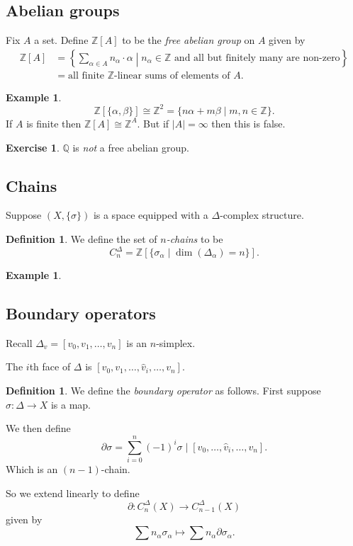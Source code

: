 \documentclass[12pt]{article}
\theoremstyle{definition}
\theoremstyle{definition}
\newtheorem{defn}[thm]{Definition}
\newtheorem{ex}[thm]{Example}
\newtheorem*{exer}{Exercise}
\newcommand{\ZZ}{\mathbb{Z}}
\newcommand{\QQ}{\mathbb{Q}}
\begin{document}
\subsection{Abelian groups}
Fix $A$ a set.
Define $\ZZ[A]$ to be the \emph{free abelian group} on $A$ given by
\begin{align*}
\ZZ[A] &= \left\{ \sum_{\alpha\in A} n_\alpha \cdot \alpha \middle| n_\alpha\in\ZZ\text{ and all but finitely many are non-zero}\right\} \\
&= \text{all finite }\ZZ\text{-linear sums of elements of }A.
\end{align*}

\begin{ex}
\[\ZZ[\{\alpha,\beta\}] \cong \ZZ^2 = \{n\alpha + m\beta \mid m,n\in \ZZ\}.\]
If $A$ is finite then $\ZZ[A] \cong \ZZ^A$.
But if $|A| = \infty$ then this is false.
\end{ex}

\begin{exer}
$\QQ$ is \emph{not} a free abelian group.
\end{exer}

\subsection{Chains}
Suppose $(X,\{\sigma\})$ is a space equipped with a $\Delta$-complex structure.

\begin{defn}
We define the set of \emph{$n$-chains} to be
\[C_n^\Delta = \ZZ[\{\sigma_\alpha \mid \dim(\Delta_\alpha) = n\}].\]
\end{defn}

\begin{ex}
\end{ex}

\subsection{Boundary operators}
Recall $\Delta_v = [v_0, v_1,\ldots,v_n]$ is an $n$-simplex.

The $i$th face of $\Delta$ is $[v_0, v_1, \ldots , \hat{v}_i, \ldots ,v_n]$. %

\begin{defn}
We define the \emph{boundary operator} as follows.
First suppose $\sigma \colon \Delta \to X$ is a map.

We then define
\[\partial \sigma = \sum_{i=0}^{n} (-1)^i \sigma \mid[v_0,\ldots,\hat{v}_i, \ldots, v_n].\]
Which is an $(n-1)$-chain.

So we extend linearly to define 
\[\partial \colon C_n^\Delta(X) \to C_{n-1}^\Delta (X)\]
given by
\[\sum n_\alpha \sigma_\alpha \mapsto \sum n_\alpha \partial \sigma_\alpha.\]
\end{defn}
\end{document}
